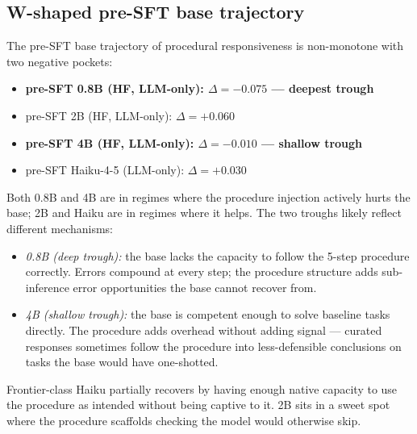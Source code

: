 \documentclass[10pt]{article}
\begin{document}
\subsection{W-shaped pre-SFT base trajectory}\label{sec:wshape}
The pre-SFT base trajectory of procedural responsiveness is non-monotone with two negative pockets:
\begin{itemize}[leftmargin=*, nosep]
  \item \textbf{pre-SFT 0.8B (HF, LLM-only): $\Delta = -0.075$ --- deepest trough}
  \item pre-SFT 2B (HF, LLM-only): $\Delta = +0.060$
  \item \textbf{pre-SFT 4B (HF, LLM-only): $\Delta = -0.010$ --- shallow trough}
  \item pre-SFT Haiku-4-5 (LLM-only): $\Delta = +0.030$
\end{itemize}
Both 0.8B and 4B are in regimes where the procedure injection actively hurts the base; 2B and Haiku are in regimes where it helps. The two troughs likely reflect different mechanisms:
\begin{itemize}[leftmargin=*, nosep]
  \item \emph{0.8B (deep trough):} the base lacks the capacity to follow the 5-step procedure correctly. Errors compound at every step; the procedure structure adds sub-inference error opportunities the base cannot recover from.
  \item \emph{4B (shallow trough):} the base is competent enough to solve baseline tasks directly. The procedure adds overhead without adding signal --- curated responses sometimes follow the procedure into less-defensible conclusions on tasks the base would have one-shotted.
\end{itemize}
Frontier-class Haiku partially recovers by having enough native capacity to use the procedure as intended without being captive to it. 2B sits in a sweet spot where the procedure scaffolds checking the model would otherwise skip.
\end{document}
